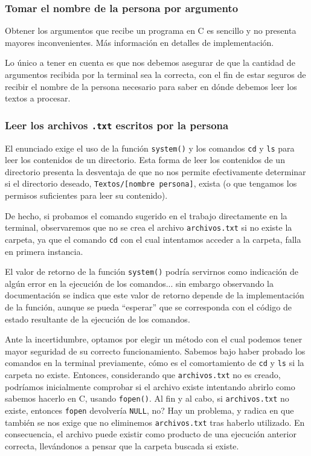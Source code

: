 \documentclass[a4paper]{article}
\begin{document}
\subsubsection{Tomar el nombre de la persona por argumento}

Obtener los argumentos que recibe un programa en C es sencillo y no presenta mayores inconvenientes. Más información en detalles de implementación.

Lo único a tener en cuenta es que nos debemos asegurar de que la cantidad de argumentos recibida por la terminal sea la correcta, con el fin de estar seguros de recibir el nombre de la persona necesario para saber en dónde debemos leer los textos a procesar.

\subsubsection{Leer los archivos \texttt{.txt} escritos por la persona}

El enunciado exige el uso de la función \texttt{system()} y los comandos \texttt{cd} y \texttt{ls} para leer los contenidos de un directorio. Esta forma de leer los contenidos de un directorio presenta la desventaja de que no nos permite efectivamente determinar si el directorio deseado, \texttt{Textos/[nombre persona]}, exista (o que tengamos los permisos suficientes para leer su contenido).

De hecho, si probamos el comando sugerido en el trabajo directamente en la terminal, observaremos que no se crea el archivo \texttt{archivos.txt} si no existe la carpeta, ya que el comando \texttt{cd} con el cual intentamos acceder a la carpeta, falla en primera instancia.

El valor de retorno de la función \texttt{system()} podría servirnos como indicación de algún error en la ejecución de los comandos... sin embargo observando la documentación se indica que este valor de retorno depende de la implementación de la función, aunque se pueda ``esperar'' que se corresponda con el código de estado resultante de la ejecución de los comandos\cite{SystemRefC}.

Ante la incertidumbre, optamos por elegir un método con el cual podemos tener mayor seguridad de su correcto funcionamiento. Sabemos bajo haber probado los comandos en la terminal previamente, cómo es el comortamiento de \texttt{cd} y \texttt{ls} si la carpeta no existe. Entonces, considerando que \texttt{archivos.txt} no es creado, podríamos inicialmente comprobar si el archivo existe intentando abrirlo como sabemos hacerlo en C, usando \texttt{fopen()}. Al fin y al cabo, si \texttt{archivos.txt} no existe, entonces \texttt{fopen} devolvería \texttt{NULL}, no? Hay un problema, y radica en que también se nos exige que no eliminemos \texttt{archivos.txt} tras haberlo utilizado. En consecuencia, el archivo puede existir como producto de una ejecución anterior correcta, llevándonos a pensar que la carpeta buscada si existe.
\end{document}
